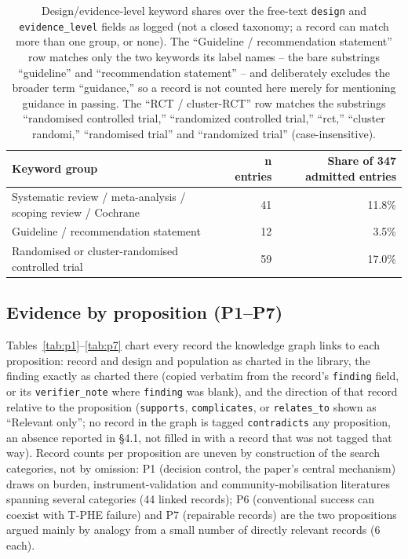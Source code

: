 \documentclass[11pt]{article}
\newcommand{\tphe}{T\mbox{-}PHE}
\begin{document}
\begin{table}[H]
\centering\footnotesize
\caption{Design/evidence-level keyword shares over the free-text \texttt{design} and
\texttt{evidence\_level} fields as logged (not a closed taxonomy; a record can match more than one
group, or none). The ``Guideline / recommendation statement'' row matches only the two keywords
its label names -- the bare substrings ``guideline'' and ``recommendation statement'' -- and
deliberately excludes the broader term ``guidance,'' so a record is not counted here merely for
mentioning guidance in passing. The ``RCT / cluster-RCT'' row matches the substrings ``randomised controlled trial,'' ``randomized controlled trial,'' ``rct,'' ``cluster randomi,'' ``randomised trial'' and ``randomized trial'' (case-insensitive).}
\label{tab:design}
\begin{tabularx}{\textwidth}{@{}Yrr@{}}
\toprule
\textbf{Keyword group} & \textbf{n entries} & \textbf{Share of 347 admitted entries}\\
\midrule
Systematic review / meta-analysis / scoping review / Cochrane & 41 & 11.8\%\\
Guideline / recommendation statement & 12 & 3.5\%\\
Randomised or cluster-randomised controlled trial & 59 & 17.0\%\\
\bottomrule
\end{tabularx}
\end{table}

\subsection{Evidence by proposition (P1--P7)}
Tables~\ref{tab:p1}--\ref{tab:p7} chart every record the knowledge graph links to each proposition:
record and design and population as charted in the library, the finding exactly as charted there
(copied verbatim from the record's \texttt{finding} field, or its \texttt{verifier\_note} where
\texttt{finding} was blank), and the direction of that record relative to the proposition
(\texttt{supports}, \texttt{complicates}, or \texttt{relates\_to} shown as ``Relevant only''; no
record in the graph is tagged \texttt{contradicts} any proposition, an absence reported in
\S4.1, not filled in with a record that was not tagged that way). Record counts per proposition are
uneven by construction of the search categories, not by omission: P1 (decision control, the
paper's central mechanism) draws on burden, instrument-validation and community-mobilisation
literatures spanning several categories (44 linked records); P6 (conventional success can coexist
with \tphe{} failure) and P7 (repairable records) are the two propositions argued mainly by
analogy from a small number of directly relevant records (6 each).
\end{document}
